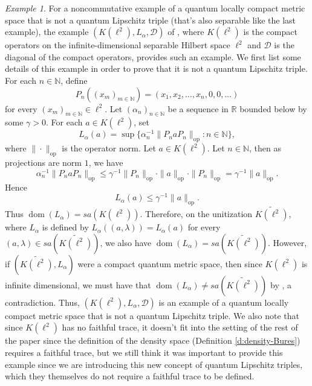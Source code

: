 \documentclass{amsart}
\theoremstyle{plain}
\theoremstyle{definition}
\theoremstyle{remark}
\newtheorem{example}[theorem]{Example}
\numberwithin{equation}{section}
\newcommand{\wt}[1]{{\widetilde{#1}}}
\newcommand{\la}{{\lambda}}
\newcommand{\al}{{\alpha}}
\newcommand{\ga}{{\gamma}}
\newcommand{\N}{{\mathds{N}}}
\newcommand{\R}{{\mathds{R}}}
\newcommand{\dom}[1]{{\operatorname*{dom}({#1})}}
\renewcommand{\leq}{\leqslant}
\begin{document}
\begin{example}\label{e:non-qlt-noncomm}
    For a noncommutative example of a quantum locally compact metric space that is not a quantum Lipschitz triple (that's also separable like the last example), the example $(K(\ell^2), L_\al, \mathcal{D})$ of \cite[Proposition 4.7]{Latremoliere12b}, where $K(\ell^2)$ is the compact operators on the infinite-dimensional separable Hilbert space $\ell^2$  and $\mathcal{D}$ is the diagonal of the compact operators, provides such an example. We first list some details of this example in order to prove that it is not a quantum Lipschitz triple. For each $n\in \N$, define
    \[
    P_n((x_m)_{m\in \N})=(x_1, x_2, \ldots, x_n, 0, 0,\ldots)
    \]
    for every $(x_m)_{m\in \N}\in \ell^2$. Let $(\al_n)_{n\in \N}$ be a sequence in $\R$ bounded below by some $\ga>0$. For each $a\in K(\ell^2)$, set
    \[
    L_\al (a)=\sup \{\al_n^{-1}\|P_naP_n\|_\mathrm{op} :n\in \N\},
    \]
    where $\|\cdot\|_\mathrm{op}$ is the operator norm. 
    Let $a\in K(\ell^2)$. Let $n\in \N$, then as projections are norm $1$, we have 
    \[
    \al_n^{-1}\|P_naP_n\|_\mathrm{op}\leq \ga^{-1}\|P_n\|_\mathrm{op}\cdot \|a\|_\mathrm{op}\cdot \|P_n\|_\mathrm{op}=\ga^{-1}\|a\|_\mathrm{op}.
    \]
    Hence
    \[
    L_\al(a)\leq \ga^{-1}\|a\|_\mathrm{op}.
    \]
    Thus $\dom{L_\al}=sa(K(\ell^2))$. Therefore, on the unitization $\wt{K(\ell^2)}$, where $L_\al$ is defined by $L_\al((a,\la))=L_\al(a)$ for every $(a,\la)\in sa(\wt{K(\ell^2)})$, we also have $\dom{L_\al}=sa(\wt{K(\ell^2)})$. However, if $(\wt{K(\ell^2)}, L_\al)$ were a compact quantum metric space, then since $K(\ell^2)$ is infinite dimensional, we must have that $\dom{L_\al}\neq sa(\wt{K(\ell^2)})$ by \cite[Corollary 2.2]{Aguilar-vBH-L}, a contradiction. Thus, $(K(\ell^2), L_\al, \mathcal{D})$ is an example of a quantum locally compact metric space that is not a quantum Lipschitz triple. We also note that since $K(\ell^2)$ has no faithful trace, it doesn't fit into the setting of the rest of the paper since the definition of the density space (Definition \ref{d:density-Bures}) requires a faithful trace, but we still think it was important to provide this example since we are introducing this new concept of quantum Lipschitz triples, which they themselves do not require a faithful trace to be defined.
\end{example}
\end{document}
